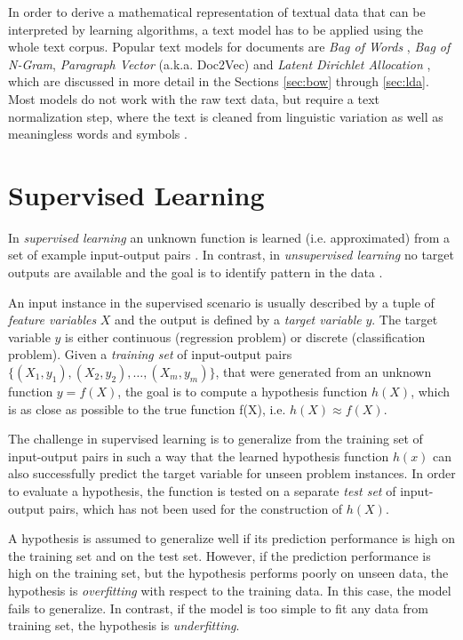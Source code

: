In order to derive a mathematical representation of textual data that can be interpreted by learning algorithms, a text model has to be applied using the whole text corpus.
Popular text models for documents are \textit{Bag of Words} \cite{harris1954distributional}, \textit{Bag of N-Gram}, \textit{Paragraph Vector} (a.k.a. Doc2Vec) \cite{DBLP:conf/icml/LeM14} and \textit{Latent Dirichlet Allocation} \cite{DBLP:journals/jmlr/BleiNJ03}, which are discussed in more detail in the Sections \ref{sec:bow} through \ref{sec:lda}.
Most models do not work with the raw text data, but require a text normalization step, where the text is cleaned from linguistic variation as well as meaningless words and symbols \cite{DBLP:books/lib/JurafskyM09}.

\section{Supervised Learning}

In \textit{supervised learning} an unknown function is learned (i.e. approximated) from a set of example input-output pairs \cite{DBLP:books/daglib/0023820}.
In contrast, in \textit{unsupervised learning} no target outputs are available and the goal is to identify pattern in the data \cite{DBLP:conf/ac/Ghahramani03}.

An input instance in the supervised scenario is usually described by a tuple of \textit{feature variables} $X$ and the output is defined by a \textit{target variable} $y$.
The target variable $y$ is either continuous (regression problem) or discrete (classification problem).
Given a \textit{training set} of input-output pairs $\{(X_1, y_1), (X_2, y_2), \dots, (X_m,y_m)\}$, that were generated from an unknown function $y = f(X)$, the goal is to compute a hypothesis function $h(X)$, which is as close as possible to the true function f(X), i.e. $h(X) \approx f(X)$.

The challenge in supervised learning is to generalize from the training set of input-output pairs in such a way that the learned hypothesis function $h(x)$ can also successfully predict the target variable for unseen problem instances.
In order to evaluate a hypothesis, the function is tested on a separate \textit{test set} of input-output pairs, which has not been used for the construction of $h(X)$.

A hypothesis is assumed to generalize well if its prediction performance is high on the training set and on the test set.
However, if the prediction performance is high on the training set, but the hypothesis performs poorly on unseen data, the hypothesis is \textit{overfitting} with respect to the training data.
In this case, the model fails to generalize.
In contrast, if the model is too simple to fit any data from training set, the hypothesis is \textit{underfitting}.

